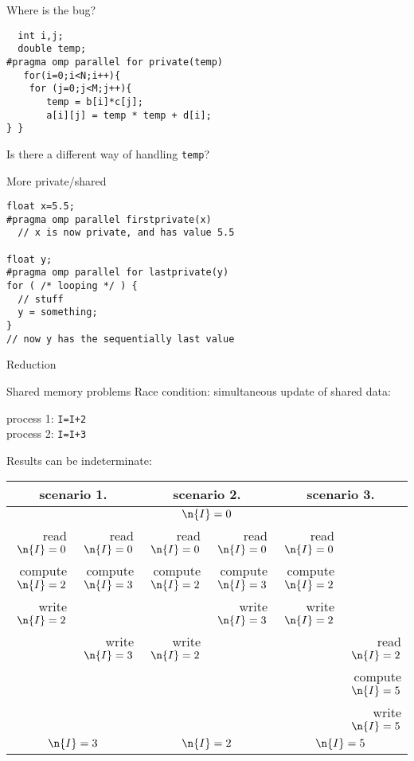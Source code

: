 \begin{numberedframe}{Where is the bug?}
\begin{lstlisting}
  int i,j;
  double temp;
#pragma omp parallel for private(temp)
   for(i=0;i<N;i++){
    for (j=0;j<M;j++){
       temp = b[i]*c[j];
       a[i][j] = temp * temp + d[i];
} }  
\end{lstlisting}
Is there a different way of handling \lstinline{temp}?
\end{numberedframe}

\begin{numberedframe}{More private/shared}
\begin{lstlisting}
float x=5.5;
#pragma omp parallel firstprivate(x)
  // x is now private, and has value 5.5

float y;
#pragma omp parallel for lastprivate(y)
for ( /* looping */ ) {
  // stuff
  y = something;
}
// now y has the sequentially last value
\end{lstlisting}
\end{numberedframe}

 {Reduction}

\begin{exerciseframe}
  
\end{exerciseframe}

\begin{numberedframe}{Shared memory problems}
Race condition: simultaneous update of shared data:
\begin{tabbing}
  process 1: \texttt{I=I+2}\\
  process 2: \texttt{I=I+3}
\end{tabbing}
Results can be indeterminate:

\tiny
\begin{tabular}{|rr|rr|rr|}
  \hline
  \multicolumn{2}{|c|}{scenario 1.}& \multicolumn{2}{|c|}{scenario 2.}&
  \multicolumn{2}{|c|}{scenario 3.}\\ \hline
  \multicolumn{6}{|c|}{$\n{I}=0$}\\ \hline
  read $\n{I}=0$&read $\n{I}=0$&
    read $\n{I}=0$&read $\n{I}=0$&
      read $\n{I}=0$& \\
  compute $\n{I}=2$&compute $\n{I}=3$& 
    compute $\n{I}=2$&compute $\n{I}=3$&
      compute $\n{I}=2$& \\
  write $\n{I}=2$& & &write $\n{I}=3$&write $\n{I}=2$& \\
  &write $\n{I}=3$&write $\n{I}=2$& & &read $\n{I}=2$\\
  &&&&&compute $\n{I}=5$\\
  &&&&&write $\n{I}=5$\\
  \hline
  \multicolumn{2}{|c|}{$\n{I}=3$}& \multicolumn{2}{|c|}{$\n{I}=2$}&
  \multicolumn{2}{|c|}{$\n{I}=5$}\\ \hline
\end{tabular}
\end{numberedframe}

